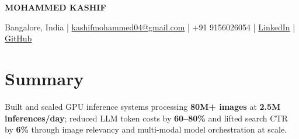 \documentclass[10pt,a4paper]{article}
\begin{document}



\begin{center}

{\LARGE \textbf{MOHAMMED KASHIF}} \\

\vspace{4pt}

Bangalore, India
\;|\;
\href{mailto:kashifmohammed04@gmail.com}{kashifmohammed04@gmail.com}
\;|\;
+91 9156026054
\;|\;
\href{https://www.linkedin.com/in/kashifmd2023iit}{LinkedIn}
\;|\;
\href{https://github.com/KASHIFMD}{GitHub}

\end{center}

\vspace{-14pt}
\section{Summary}
Built and scaled GPU inference systems processing \textbf{80M+ images} at \textbf{2.5M inferences/day}; reduced LLM token costs by \textbf{60--80\%} and lifted search CTR by \textbf{6\%} through image relevancy and multi-modal model orchestration at scale.


\end{document}
